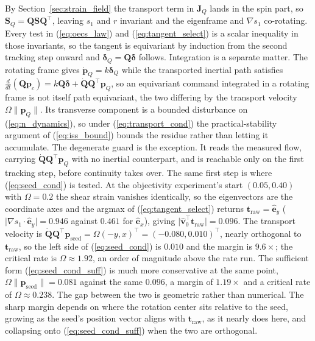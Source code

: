 \documentclass[lettersize,journal]{IEEEtran}
\begin{document}
\begin{IEEEproof}
By Section~\ref{sec:strain_field} the transport term in $\mathbf{J}_Q$ lands in the
spin part, so $\mathbf{S}_Q = \mathbf{Q}\mathbf{S}\mathbf{Q}^\top$,
leaving $s_1$ and $r$ invariant and the eigenframe and $\nabla s_1$
co-rotating. Every test in (\ref{eq:oecs_law}) and
(\ref{eq:tangent_select}) is a scalar inequality in those invariants, so
the tangent is equivariant by induction from the second tracking step
onward and $\boldsymbol{\delta}_Q = \mathbf{Q}\boldsymbol{\delta}$
follows. Integration is a separate matter. The rotating frame gives
$\dot{\mathbf{p}}_Q = k\boldsymbol{\delta}_Q$ while the transported
inertial path satisfies $\tfrac{d}{dt}(\mathbf{Q}\mathbf{p}_c) =
k\mathbf{Q}\boldsymbol{\delta} +
\dot{\mathbf{Q}}\mathbf{Q}^\top\mathbf{p}_Q$, so an equivariant command
integrated in a rotating frame is not itself path equivariant, the two
differing by the transport velocity $\Omega\lVert\mathbf{p}_Q\rVert$.
Its transverse component is a bounded disturbance on
(\ref{eq:n_dynamics}), so under (\ref{eq:transport_cond}) the
practical-stability argument of (\ref{eq:iss_bound}) bounds the residue
rather than letting it accumulate. The degenerate guard is the exception.
It reads the
measured flow, carrying
$\dot{\mathbf{Q}}\mathbf{Q}^\top\mathbf{p}_Q$ with no inertial
counterpart, and is reachable only on the first tracking step, before
continuity takes over. The same first step is where
(\ref{eq:seed_cond}) is tested. At the objectivity experiment's start
$(0.05, 0.40)$ with $\Omega = 0.2$ the shear strain vanishes
identically, so the eigenvectors are the coordinate axes and the argmax
of (\ref{eq:tangent_select}) returns $\mathbf{t}_{\text{raw}} =
\hat{\mathbf{e}}_y$ ($\lvert\nabla s_1 \cdot \hat{\mathbf{e}}_y\rvert =
0.946$ against $0.461$ for $\hat{\mathbf{e}}_x$), giving
$\lvert\hat{\mathbf{v}}_0^\top\mathbf{t}_{\text{raw}}\rvert = 0.096$.
The transport velocity is
$\dot{\mathbf{Q}}\mathbf{Q}^\top\mathbf{p}_{\text{seed}} = \Omega(-y,
x)^\top = (-0.080, 0.010)^\top$, nearly orthogonal to
$\mathbf{t}_{\text{raw}}$, so the left side of (\ref{eq:seed_cond}) is
$0.010$ and the margin is $9.6\times$; the critical rate is
$\Omega \approx 1.92$, an order of magnitude above the rate run. The
sufficient form (\ref{eq:seed_cond_suff}) is much more conservative at
the same point, $\Omega\lVert\mathbf{p}_{\text{seed}}\rVert = 0.081$
against the same $0.096$, a margin of $1.19\times$ and a critical rate
of $\Omega \approx 0.238$. The gap between the two is geometric rather
than numerical. The sharp margin depends on where the rotation center
sits relative to the seed, growing as the seed's position vector aligns
with $\mathbf{t}_{\text{raw}}$, as it nearly does here, and collapsing
onto (\ref{eq:seed_cond_suff}) when the two are orthogonal.
\end{IEEEproof}
\end{document}
